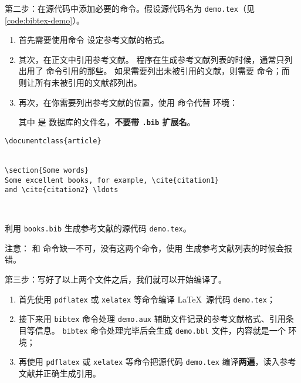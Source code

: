 第二步：在源代码中添加必要的命令。假设源代码名为 \texttt{demo.tex}（见 \ref{code:bibtex-demo}）。
\begin{enumerate}
\item {}
首先需要使用命令  设定参考文献的格式。

\item {}
其次，在正文中引用参考文献。 程序在生成参考文献列表的时候，通常只列出用了  命令引用的那些。
如果需要列出未被引用的文献，则需要  命令；而 \marg*{*} 则让所有未被引用的文献都列出。

\item {}
再次，在你需要列出参考文献的位置，使用  命令代替  环境：
\begin{command}
\end{command}

其中  是  数据库的文件名，\textbf{不要带 \texttt{.bib} 扩展名}。
\end{enumerate}

\begin{sourcecode}[htp]
\begin{Verbatim}
\documentclass{article}


\section{Some words}
Some excellent books, for example, \cite{citation1} 
and \cite{citation2} \ldots



\end{Verbatim}
\caption{利用 \texttt{books.bib} 生成参考文献的源代码 \texttt{demo.tex}。}\label{code:bibtex-demo}
\end{sourcecode}

注意： 和  命令缺一不可，没有这两个命令，使用  生成参考文献列表的时候会报错。

第三步：写好了以上两个文件之后，我们就可以开始编译了。
\begin{enumerate}
  \item 首先使用 \texttt{pdflatex} 或 \texttt{xelatex} 等命令编译 \LaTeX\ 源代码 \texttt{demo.tex}；
  \item 接下来用 \texttt{bibtex} 命令处理 \texttt{demo.aux} 辅助文件记录的参考文献格式、引用条目等信息。
  \texttt{bibtex} 命令处理完毕后会生成 \texttt{demo.bbl} 文件，内容就是一个  环境；
  \item 再使用 \texttt{pdflatex} 或 \texttt{xelatex} 等命令把源代码 \texttt{demo.tex} 编译\textbf{两遍}，读入参考文献并正确生成引用。
\end{enumerate}

